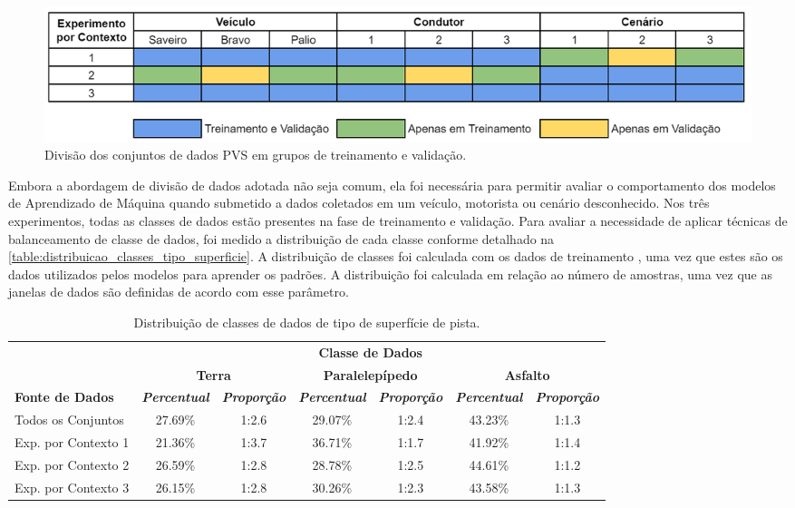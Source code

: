 \begin{figure}[h]
  \centering
  \caption{Divisão dos conjuntos de dados PVS em grupos de treinamento e validação.}
  \label{fig:divisao_conjuntos_pvs}
  \includegraphics[width=1\textwidth]{figuras/fig_29.png}
\end{figure}

Embora a abordagem de divisão de dados adotada não seja comum, ela foi necessária para permitir avaliar o comportamento dos modelos de Aprendizado de Máquina quando submetido a dados coletados em um veículo, motorista ou cenário desconhecido. Nos três experimentos, todas as classes de dados estão presentes na fase de treinamento e validação. Para avaliar a necessidade de aplicar técnicas de balanceamento de classe de dados, foi medido a distribuição de cada classe conforme detalhado na \autoref{table:distribuicao_classes_tipo_superficie}. A distribuição de classes foi calculada com os dados de treinamento \cite{He2013,Kuhn2013}, uma vez que estes são os dados utilizados pelos modelos para aprender os padrões. A distribuição foi calculada em relação ao número de amostras, uma vez que as janelas de dados são definidas de acordo com esse parâmetro.

\begin{table}[h]
\caption{Distribuição de classes de dados de tipo de superfície de pista.}
\label{table:distribuicao_classes_tipo_superficie}
\centering
\scriptsize
\begin{tabular}{lcccccc}
\cmidrule(l){2-7}
\multicolumn{1}{c}{\multirow{2}{*}{\textbf{}}} & 
\multicolumn{6}{c}{\textbf{Classe de Dados}} \\ \cmidrule(l){2-7} 
\multicolumn{1}{c}{} & 
\multicolumn{2}{c}{\textbf{Terra}} & 
\multicolumn{2}{c}{\textbf{Paralelepípedo}} & 
\multicolumn{2}{c}{\textbf{Asfalto}} \\ \midrule
\textbf{Fonte de Dados} & 
\textit{\textbf{Percentual}} & 
\textit{\textbf{Proporção}} & 
\textit{\textbf{Percentual}} & 
\textit{\textbf{Proporção}} & 
\textit{\textbf{Percentual}} & 
\textit{\textbf{Proporção}} \\ \midrule
Todos os Conjuntos & 27.69\% & 1:2.6 & 29.07\% & 1:2.4 & 43.23\% & 1:1.3 \\ \midrule
Exp. por Contexto 1 & 21.36\% & 1:3.7 & 36.71\% & 1:1.7 & 41.92\% & 1:1.4 \\ \midrule
Exp. por Contexto 2 & 26.59\% & 1:2.8 & 28.78\% & 1:2.5 & 44.61\% & 1:1.2 \\ \midrule
Exp. por Contexto 3 & 26.15\% & 1:2.8 & 30.26\% & 1:2.3 & 43.58\% & 1:1.3 \\ \bottomrule
\end{tabular}
\end{table}

